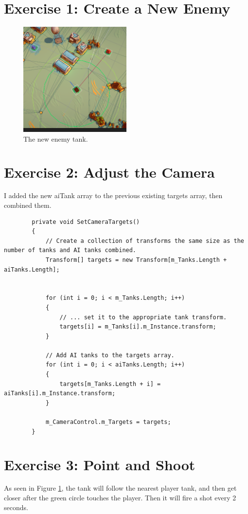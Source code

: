 \section{Exercise 1: Create a New Enemy}
    \begin{figure}[h]
        \centering
        \includegraphics[width=0.5\textwidth]{imgs/tankai.png}
        \caption{The new enemy tank.}
        \label{fig:tankai}
    \end{figure}

\section{Exercise 2: Adjust the Camera}
    I added the new aiTank array to the previous existing targets array, then combined them.

    \begin{verbatim}
        private void SetCameraTargets()
        {
            // Create a collection of transforms the same size as the number of tanks and AI tanks combined.
            Transform[] targets = new Transform[m_Tanks.Length + aiTanks.Length];


            for (int i = 0; i < m_Tanks.Length; i++)
            {
                // ... set it to the appropriate tank transform.
                targets[i] = m_Tanks[i].m_Instance.transform;
            }

            // Add AI tanks to the targets array.
            for (int i = 0; i < aiTanks.Length; i++)
            {
                targets[m_Tanks.Length + i] = aiTanks[i].m_Instance.transform;
            }

            m_CameraControl.m_Targets = targets;
        }
    \end{verbatim}

\section{Exercise 3: Point and Shoot}
    As seen in Figure \ref{fig:tankai}, the tank will follow the nearest player tank, and then get closer after the green circle touches the player. Then it will fire a shot every 2 seconds.
